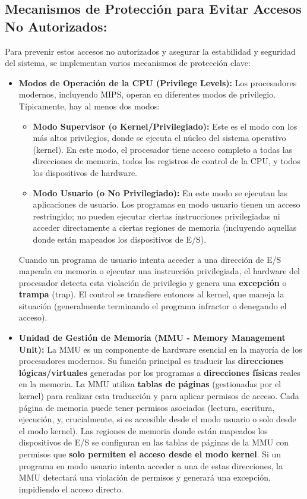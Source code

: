 \documentclass[12pt, a4paper]{article}
\begin{document}
\subsection*{Mecanismos de Protección para Evitar Accesos No Autorizados:}
Para prevenir estos accesos no autorizados y asegurar la estabilidad y seguridad del sistema, se implementan varios mecanismos de protección clave:
\begin{itemize}
    \item \textbf{Modos de Operación de la CPU (Privilege Levels):}
    Los procesadores modernos, incluyendo MIPS, operan en diferentes modos de privilegio. Típicamente, hay al menos dos modos:
    \begin{itemize}
        \item \textbf{Modo Supervisor (o Kernel/Privilegiado):} Este es el modo con los más altos privilegios, donde se ejecuta el núcleo del sistema operativo (kernel). En este modo, el procesador tiene acceso completo a todas las direcciones de memoria, todos los registros de control de la CPU, y todos los dispositivos de hardware.
        \item \textbf{Modo Usuario (o No Privilegiado):} En este modo se ejecutan las aplicaciones de usuario. Los programas en modo usuario tienen un acceso restringido; no pueden ejecutar ciertas instrucciones privilegiadas ni acceder directamente a ciertas regiones de memoria (incluyendo aquellas donde están mapeados los dispositivos de E/S).
    \end{itemize}
    Cuando un programa de usuario intenta acceder a una dirección de E/S mapeada en memoria o ejecutar una instrucción privilegiada, el hardware del procesador detecta esta violación de privilegio y genera una \textbf{excepción} o \textbf{trampa} (trap). El control se transfiere entonces al kernel, que maneja la situación (generalmente terminando el programa infractor o denegando el acceso).

    \item \textbf{Unidad de Gestión de Memoria (MMU - Memory Management Unit):}
    La MMU es un componente de hardware esencial en la mayoría de los procesadores modernos. Su función principal es traducir las \textbf{direcciones lógicas/virtuales} generadas por los programas a \textbf{direcciones físicas} reales en la memoria. La MMU utiliza \textbf{tablas de páginas} (gestionadas por el kernel) para realizar esta traducción y para aplicar permisos de acceso. Cada página de memoria puede tener permisos asociados (lectura, escritura, ejecución, y, crucialmente, si es accesible desde el modo usuario o solo desde el modo kernel). Las regiones de memoria donde están mapeados los dispositivos de E/S se configuran en las tablas de páginas de la MMU con permisos que \textbf{solo permiten el acceso desde el modo kernel}. Si un programa en modo usuario intenta acceder a una de estas direcciones, la MMU detectará una violación de permisos y generará una excepción, impidiendo el acceso directo.


\end{itemize}
\end{document}
